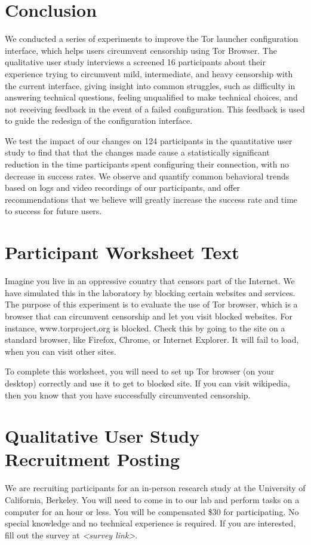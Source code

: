 \documentclass[USenglish,oneside,twocolumn]{article}
\begin{document}
\section{Conclusion} 
We conducted a series of experiments to improve the Tor launcher configuration interface, which helps users circumvent censorship using Tor Browser. The qualitative user study interviews a screened 16 participants about their experience trying to circumvent mild, intermediate, and heavy censorship with the current interface, giving insight into common struggles, such as difficulty in answering technical questions, feeling unqualified to make technical choices, and not receiving feedback in the event of a failed configuration. This feedback is used to guide the redesign of the configuration interface. 

We test the impact of our changes on 124 participants in the quantitative user study to find that that the changes made cause a statistically significant reduction in the time participants spent configuring their connection, with no decrease in success rates. We observe and quantify common behavioral trends based on logs and video recordings of our participants, and offer recommendations that we believe will greatly increase the success rate and time to success for future users. 


\nocite{*}


\appendix
\section{Participant Worksheet Text} 
\label{participant-worksheet}
Imagine you live in an oppressive country that censors part of the Internet. We have simulated this in the laboratory by blocking certain websites and services. The purpose of this experiment is to evaluate the use of Tor browser, which is a browser that can circumvent censorship and let you visit blocked websites. For instance, www.torproject.org is blocked. Check this by going to the site on a standard browser, like Firefox, Chrome, or Internet Explorer. It will fail to load, when you can visit other sites.

To complete this worksheet, you will need to set up Tor browser (on your desktop) correctly and use it to get to blocked site. If you can visit wikipedia, then you know that you have successfully circumvented censorship.

\section{Qualitative User Study Recruitment Posting} 
\label{qualitative-recruitment}
We are recruiting participants for an in-person research study at the University of California, Berkeley. You will need to come in to our lab and perform tasks on a computer for an hour or less. You will be compensated \$30 for participating. 
No special knowledge and no technical experience is required. If you are interested, fill out the survey at \textit{<survey link>}. 
\end{document}
